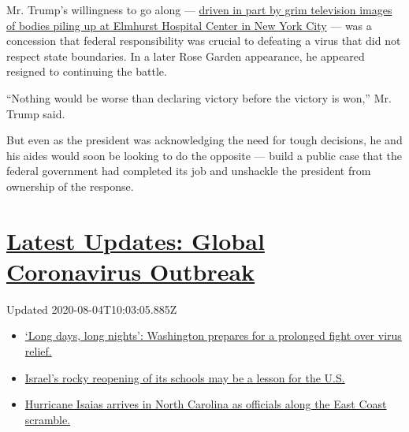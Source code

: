 Mr. Trump's willingness to go along ---
\href{https://www.nytimes3xbfgragh.onion/2020/03/30/us/politics/trump-coronavirus.html}{driven
in part by grim television images of bodies piling up at Elmhurst
Hospital Center in New York City} --- was a concession that federal
responsibility was crucial to defeating a virus that did not respect
state boundaries. In a later Rose Garden appearance, he appeared
resigned to continuing the battle.

``Nothing would be worse than declaring victory before the victory is
won,'' Mr. Trump said.

But even as the president was acknowledging the need for tough
decisions, he and his aides would soon be looking to do the opposite ---
build a public case that the federal government had completed its job
and unshackle the president from ownership of the response.

\hypertarget{latest-updates-global-coronavirus-outbreak}{%
\section{\texorpdfstring{\href{https://www.nytimes3xbfgragh.onion/2020/08/04/world/coronavirus-covid-19.html?action=click\&pgtype=Article\&state=default\&region=MAIN_CONTENT_1\&context=storylines_live_updates}{Latest
Updates: Global Coronavirus
Outbreak}}{Latest Updates: Global Coronavirus Outbreak}}\label{latest-updates-global-coronavirus-outbreak}}

Updated 2020-08-04T10:03:05.885Z

\begin{itemize}
\tightlist
\item
  \href{https://www.nytimes3xbfgragh.onion/2020/08/04/world/coronavirus-covid-19.html?action=click\&pgtype=Article\&state=default\&region=MAIN_CONTENT_1\&context=storylines_live_updates\#link-6b644638}{`Long
  days, long nights': Washington prepares for a prolonged fight over
  virus relief.}
\item
  \href{https://www.nytimes3xbfgragh.onion/2020/08/04/world/coronavirus-covid-19.html?action=click\&pgtype=Article\&state=default\&region=MAIN_CONTENT_1\&context=storylines_live_updates\#link-7af9fca0}{Israel's
  rocky reopening of its schools may be a lesson for the U.S.}
\item
  \href{https://www.nytimes3xbfgragh.onion/2020/08/04/world/coronavirus-covid-19.html?action=click\&pgtype=Article\&state=default\&region=MAIN_CONTENT_1\&context=storylines_live_updates\#link-33bf9168}{Hurricane
  Isaias arrives in North Carolina as officials along the East Coast
  scramble.}
\end{itemize}


